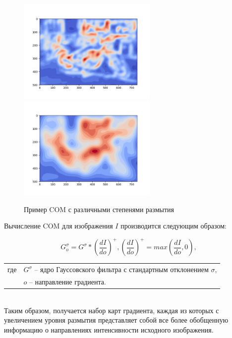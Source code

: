 {{{{{		\begin{figure}[H]
			\centering                             
			\includegraphics[width=0.6\textwidth,keepaspectratio]{daisy/bike_gradient_COM_1.png}   
			\includegraphics[width=0.6\textwidth,keepaspectratio]{daisy/bike_gradient_COM_2.png}       
			\centering\caption{ Пример COM с различными степенями размытия }
			\label{gradient_example}                           
		\end{figure}    
		
		Вычисление COM для изображения $I$ производится следующим образом:
		
		\begin{equation}\label{coms}
		G_o^\sigma = G^\sigma * \left(\dfrac{dI}{do}\right)^+ , \left(\dfrac{dI}{do}\right)^+ = max\left(\dfrac{dI}{do}, 0\right),
		\end{equation}
		\begin{tabular}{ rl }
			\quad \quad где 
			& $ G^\sigma $ -- ядро Гауссовского фильтра с стандартным отклонением $ \sigma $,\\
			& $o$ -- направление градиента.
		\end{tabular}\\
		
		Таким образом, получается набор карт градиента, каждая из которых с увеличением уровня размытия представляет собой все более обобщенную информацию о направлениях интенсивности исходного изображения. 
		
}}}}}
